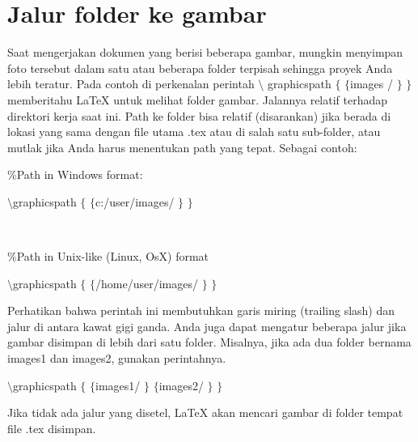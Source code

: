 \section {Jalur folder ke gambar }
\vspace{12pt}
\noindent 
Saat mengerjakan dokumen yang berisi beberapa gambar, mungkin menyimpan foto tersebut dalam satu atau beberapa folder terpisah sehingga proyek Anda lebih teratur. Pada contoh di perkenalan perintah  $  \setminus  $ graphicspath  $  \{  $ $  \{  $images / $  \}  $ $  \}  $ memberitahu LaTeX untuk melihat folder gambar. Jalannya relatif terhadap direktori kerja saat ini. Path ke folder bisa relatif (disarankan) jika berada di lokasi yang sama dengan file utama .tex atau di salah satu sub-folder, atau mutlak jika Anda harus menentukan path yang tepat. Sebagai contoh: \par
\vspace{12pt}
\vspace{12pt}
\vspace{12pt}
\vspace{12pt}
\noindent 
 $  \%  $Path in Windows format: \par
\vspace{12pt}
\noindent 
 $  \setminus  $graphicspath $  \{  $  $  \{  $c:/user/images/ $  \}  $  $  \}  $ \par
\noindent 
 $  $ \par
\noindent 
 $  \%  $Path in Unix-like (Linux, OsX) format \par
\vspace{12pt}
\noindent 
 $  \setminus  $graphicspath $  \{  $  $  \{  $/home/user/images/ $  \}  $  $  \}  $ \par
\vspace{12pt}
\vspace{12pt}
\vspace{12pt}
\noindent 
Perhatikan bahwa perintah ini membutuhkan garis miring (trailing slash) dan jalur di antara kawat gigi ganda. Anda juga dapat mengatur beberapa jalur jika gambar disimpan di lebih dari satu folder. Misalnya, jika ada dua folder bernama images1 dan images2, gunakan perintahnya. \par
\vspace{12pt}
\noindent 
 $  \setminus  $graphicspath $  \{  $  $  \{  $images1/ $  \}  $ $  \{  $images2/ $  \}  $  $  \}  $ \par
\noindent 
\vspace{\baselineskip}
\vspace{12pt}
\noindent 
Jika tidak ada jalur yang disetel, LaTeX akan mencari gambar di folder tempat file .tex disimpan. \par
\vspace{18pt}
\noindent 
